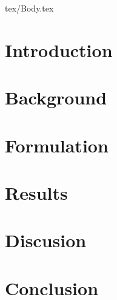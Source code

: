 \documentclass[11pt, twoside,draft]{article}
\begin{document}
\clearpage


\setcounter{tocdepth}{3}

\tableofcontents

\clearpage


%
\printnoidxglossaries

\clearpage

\listoftodos


\cleardoublepage




\ifdraft{

}
{
\begin{multicols}{2}

\end{multicols}
}
\begin{filecontents}{tex/Body.tex}

\section{Introduction}
\label{sec:introduction}


%

\section{Background}
\label{sec:background}


%

\section{Formulation}
\label{sec:formulation}


% 

\clearpage

\section{Results}
\label{sec:results}


%

\section{Discusion}
\label{sec:discusion}


%

\section{Conclusion}
\label{sec:conclusion}




\end{filecontents}
\end{document}
